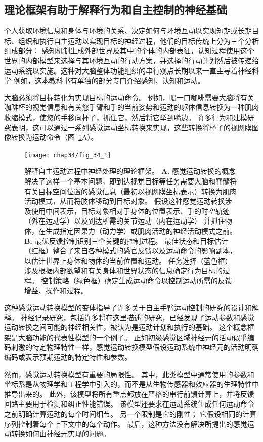 \subsection{理论框架有助于解释行为和自主控制的神经基础}

个人获取环境信息和身体与环境的关系、决定如何与环境互动以实现短期或长期目标、组织和执行自主运动以实现目标的神经过程，他们的目标传统上分为三个分析组成部分：
感知机制生成外部世界及其中的个体的内部表征，认知过程使用这个世界的内部模型来选择与其环境互动的行动方案，并选择的行动计划然后被传递给运动系统以实施。这种对大脑整体功能组织的串行观点长期以来一直主导着神经科学
例如，这本教科书有单独的部分专门介绍感知、认知和运动。


大脑必须将目标转化为实现目标的运动命令。
例如，喝一口咖啡需要大脑将有关咖啡杯的视觉信息和有关您手臂和手的当前姿势和运动的躯体信息转换为一种肌肉收缩模式，使您的手移向杯子，抓住它，然后将它举到嘴边。
许多行为和建模研究表明，这可以通过一系列感觉运动坐标转换来实现，这些转换将杯子的视网膜图像转换为运动命令（图~\ref{fig:34_1}A）。


\begin{figure}[htbp]
	\centering
	\texttt{[image: chap34/fig\_34\_1]}
	\caption{解释自主运动过程中神经处理的理论框架。
		\textbf{A.} 感觉运动转换的概念解决了这样一个基本问题，即到达视觉目标等任务需要大脑和脊髓将有关目标空间位置的感觉信息（最初以视网膜坐标表示）转换为肌肉活动模式，从而将肢体移动到目标对象。 
		假设这种感觉运动转换涉及使用中间表示，目标对象相对于身体的位置表示、手的时空轨迹（外在运动学）以及到达所需的关节运动（内在运动学） 并抓住物体，在生成指定因果力（动力学）或肌肉活动的神经活动模式之前。 
		\textbf{B.} 最优反馈控制识别三个关键的控制过程。 
		最佳状态和目标估计（红框）整合了来自各种模式的感官反馈以及运动命令的影响副本，以估计世界上身体和物体的当前位置和运动。
		任务选择（蓝色框）涉及根据内部欲望和有关身体和世界状态的信息确定行为目标的过程。
		控制策略（绿色框）确定生成运动命令以控制运动所需的反馈增益、操作和过程。}
	\label{fig:34_1}
\end{figure}


这种感觉运动转换模型的变体指导了许多关于自主手臂运动控制的研究的设计和解释。
神经记录研究，包括许多将在这里描述的研究，已经发现了运动参数和感觉运动转换之间可能的神经相关性，被认为是运动计划和执行的基础。
这个概念框架是大脑功能的代表性模型的一个例子。
正如初级感觉区域神经元的活动似乎编码刺激的特定物理特性一样，感觉运动转换模型假设运动系统中神经元的活动明确编码或表示预期运动的特定特性和参数。


然而，感觉运动转换模型有重要的局限性。
其中，此类模型中通常使用的参数和坐标系是从物理学和工程学中引入的，而不是从生物传感器和效应器的生理特性中推导出来的。
此外，该模型将所有重点都放在严格的串行前馈计算上，并将反馈回路主要用于检测和纠正性能错误。
该模型还要求在运动系统生成任何运动命令之前明确计算运动的每个时间细节。
另一个限制是它的刚性；
它假设相同的计算序列控制着每个上下文中的每个动作。
最后，这种方法没有解决所提出的感觉运动转换如何由神经元实现的问题。


